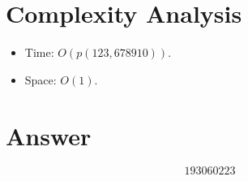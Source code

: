\documentclass[11pt]{article}
\begin{document}
\section{Complexity Analysis}

\begin{itemize}
  \item Time: $O(p(123,678910))$.
  \item Space: $O(1)$.
\end{itemize}

\section{Answer}

\[
\boxed{193060223}
\]
\end{document}
